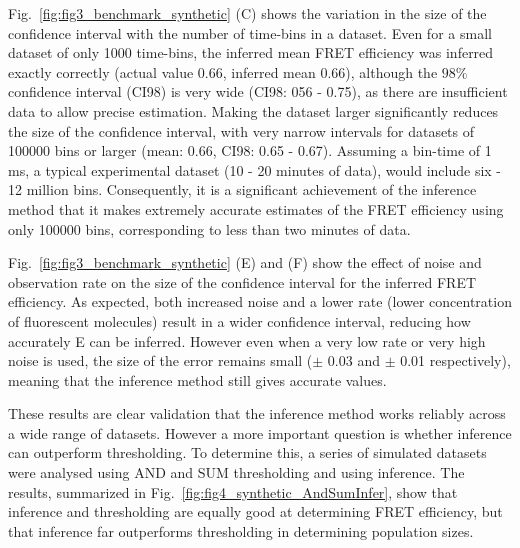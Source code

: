 Fig.~\ref{fig:fig3_benchmark_synthetic} (C) shows the variation in the size of the confidence interval with the number of time-bins in a dataset.  Even for a small dataset of only 1000 time-bins, the inferred mean FRET efficiency was inferred exactly correctly (actual value 0.66, inferred mean 0.66), although the $98 \%$ confidence interval (CI98) is very wide (CI98: 056 - 0.75), as there are insufficient data to allow precise estimation. Making the dataset larger significantly reduces the size of the confidence interval, with very narrow intervals for datasets of 100000 bins or larger (mean: 0.66, CI98: 0.65 - 0.67). Assuming a bin-time of 1 ms, a typical experimental dataset (10 - 20 minutes of data), would include six - 12 million bins. Consequently, it is a significant achievement of the inference method that it makes extremely accurate estimates of the FRET efficiency using only 100000 bins, corresponding to less than two minutes of data. 

Fig.~\ref{fig:fig3_benchmark_synthetic} (E) and (F) show the effect of noise and observation rate on the size of the confidence interval for the inferred FRET efficiency.  As expected, both increased noise and a lower rate (lower concentration of fluorescent molecules) result in a wider confidence interval, reducing how accurately E can be inferred.  However even when a very low rate or very high noise is used, the size of the error remains small ($\pm$ 0.03 and $\pm$ 0.01 respectively), meaning that the inference method still gives accurate values.


These results are clear validation that the inference method works reliably across a wide range of datasets. However a more important question is whether inference can outperform thresholding. To determine this, a series of simulated datasets were analysed using AND and SUM thresholding and using inference.  The results, summarized in Fig.~\ref{fig:fig4_synthetic_AndSumInfer}, show that inference and thresholding are equally good at determining FRET efficiency, but that inference far outperforms thresholding in determining population sizes.

